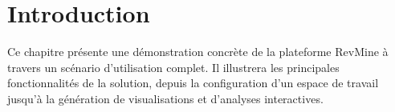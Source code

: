 
\section{Introduction}

Ce chapitre présente une démonstration concrète de la plateforme RevMine à travers un scénario d'utilisation complet. Il illustrera les principales fonctionnalités de la solution, depuis la configuration d'un espace de travail jusqu'à la génération de visualisations et d'analyses interactives.
